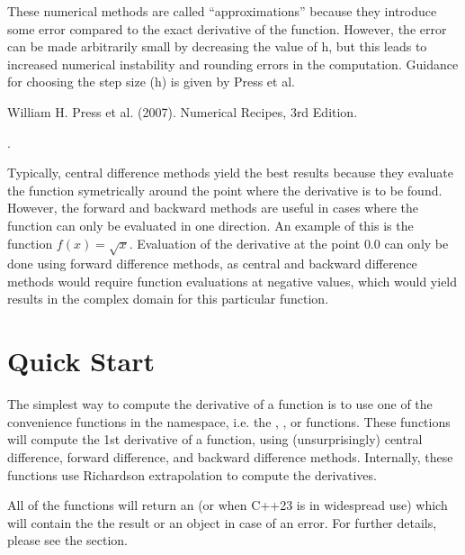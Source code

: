 \documentclass[letterpaper,10pt,english]{sphinxmanual}
\begin{document}
\sphinxAtStartPar
These numerical methods are called “approximations” because they introduce some error compared to the exact derivative of the function. However, the error can be made arbitrarily small by decreasing the value of h, but this leads to increased numerical instability and rounding errors in the computation. Guidance for choosing the step size (h) is given by Press et al. %
\begin{footnote}[1]\sphinxAtStartFootnote
William H. Press et al. (2007). Numerical Recipes, 3rd Edition.
%
\end{footnote}.

\sphinxAtStartPar
Typically, central difference methods yield the best results because they evaluate the function symetrically around the point where the derivative is to be found. However, the forward and backward methods are useful in cases where the function can only be evaluated in one direction. An example of this is the function \(f(x) = \sqrt{x}\). Evaluation of the derivative at the point \(0.0\) can only be done using  forward difference methods, as central and backward difference methods would require function evaluations at negative values, which would yield results in the complex domain for this particular function.


\section{Quick Start}
\label{\detokenize{docDerivative:quick-start}}
\sphinxAtStartPar
The simplest way to compute the derivative of a function is to use one of the convenience functions in the  namespace, i.e. the , , or  functions. These functions will compute the 1st derivative of a function, using (unsurprisingly) central difference, forward difference, and backward difference methods. Internally, these functions use Richardson extrapolation to compute the derivatives.

\sphinxAtStartPar
All of the functions will return an  (or  when C++23 is in widespread use) which will contain the the result or an  object in case of an error. For further details, please see the {\hyperref[\detokenize{docError:error-handling}]{}} section.
\end{document}
